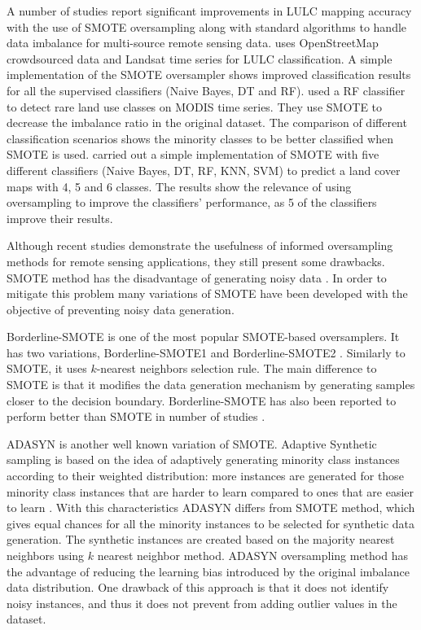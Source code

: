 \documentclass[remotesensing,article,submit,moreauthors,pdftex]{Definitions/mdpi}
\begin{document}
A number of studies report significant improvements in LULC mapping accuracy
with the use of SMOTE oversampling along with standard algorithms to handle data
imbalance for multi-source remote sensing data. \cite{Johnson2016} uses
OpenStreetMap crowdsourced data and Landsat time series for LULC classification.
A simple implementation of the SMOTE oversampler shows improved classification
results for all the supervised classifiers (Naive Bayes, DT and RF).
\cite{Bogner2018} used a RF classifier to detect rare land use classes on MODIS
time series. They use SMOTE to decrease the imbalance ratio in the original
dataset. The comparison of different classification scenarios shows the minority
classes to be better classified when SMOTE is used. \cite{Panda2018} carried out
a simple implementation of SMOTE with five different classifiers (Naive Bayes,
DT, RF, KNN, SVM) to predict a land cover maps with 4, 5 and 6 classes. The
results show the relevance of using oversampling to improve the classifiers'
performance, as 5 of the classifiers improve their results.

Although recent studies demonstrate the usefulness of informed oversampling
methods for remote sensing applications, they still present some drawbacks.
SMOTE method has the disadvantage of generating noisy data \cite{He2008}. In
order to mitigate this problem many variations of SMOTE have been developed with
the objective of preventing noisy data generation.

Borderline-SMOTE is one of the most popular SMOTE-based oversamplers. It has two
variations, Borderline-SMOTE1 and Borderline-SMOTE2 \cite{Han2005}. Similarly to
SMOTE, it uses $k$-nearest neighbors selection rule. The main difference to
SMOTE is that it modifies the data generation mechanism by generating samples
closer to the decision boundary. Borderline-SMOTE has also been reported to
perform better than SMOTE in number of studies \cite{Nguyen2009, Ramentol2012}.

ADASYN is another well known variation of SMOTE. Adaptive Synthetic sampling is
based on the idea of adaptively generating minority class instances according to
their weighted distribution: more instances are generated for those minority
class instances that are harder to learn compared to ones that are easier to
learn \cite{HaiboHe2008}. With this characteristics ADASYN differs from SMOTE
method, which gives equal chances for all the minority instances to be selected
for synthetic data generation. The synthetic instances are created based on the
majority nearest neighbors using $k$ nearest neighbor method. ADASYN
oversampling method has the advantage of reducing the learning bias introduced
by the original imbalance data distribution. One drawback of this approach is
that it does not identify noisy instances, and thus it does not prevent from
adding outlier values in the dataset.
\end{document}
